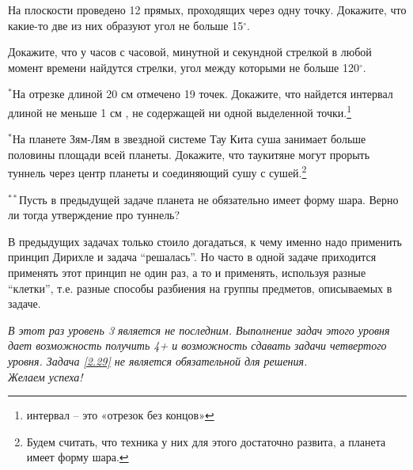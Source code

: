 \begin{thm}
	На плоскости проведено 12 прямых, проходящих через одну точку. Докажите, что какие-то две из них образуют угол не больше 15$^\circ$.
\end{thm}

\begin{thm}
	Докажите, что у часов с часовой, минутной и секундной стрелкой в любой момент времени найдутся стрелки, угол между которыми не больше 120$^\circ$.
\end{thm}

\begin{thm}
	$^\ast$На отрезке длиной 20 см отмечено 19 точек. Докажите, что найдется интервал длиной не меньше 1 см , не содержащей ни одной выделенной точки.\footnote{интервал – это «отрезок без концов»}
\end{thm}

\begin{thm}
	$^\ast$На планете Зям-Лям в звездной системе Тау Кита суша занимает больше половины площади всей планеты. Докажите, что таукитяне могут прорыть туннель через центр планеты и соединяющий сушу с сушей.\footnote{Будем считать, что техника у них для этого достаточно развита, а планета имеет форму шара.}
\end{thm}

\begin{thm}\label{2.29}
	$^{\ast\ast}$Пусть в предыдущей задаче планета не обязательно имеет форму шара. Верно ли тогда утверждение про туннель?
\end{thm}

В предыдущих задачах только стоило догадаться, к чему именно надо применить принцип Дирихле и задача “решалась”. Но часто в одной задаче приходится применять этот принцип не один раз, а то и применять, используя разные “клетки”, т.е. разные способы разбиения на группы предметов, описываемых в задаче. 

\textit{В этот раз уровень 3 является не последним. Выполнение задач этого уровня дает возможность получить 4+ и возможность сдавать задачи четвертого уровня. Задача \ref{2.29} не является обязательной для решения. \\Желаем успеха!}

